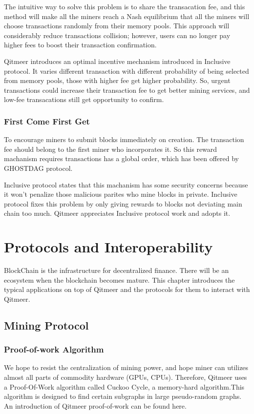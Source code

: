 \documentclass[a4paper,11pt]{article}
\begin{document}
The intuitive way to solve this problem is to share the transacation fee, and this method will make all the miners reach a Nash equilibrium that all the miners will choose transactions randomly from their memory pools. This approach will considerably reduce transactions collision; however, users can no longer pay higher fees to boost their transaction confirmation. 

Qitmeer introduces an optimal incentive mechanism introduced in Inclusive protocol. It varies different transaction with different probability of being selected from memory pools, those with higher fee get higher probability. So, urgent transactions could increase their transaction fee to get better mining services, and low-fee transacations still get opportunity to confirm.

\subsubsection{First Come First Get}
To encourage miners to submit blocks immediately on creation. The transaction fee should belong to the first miner who incorporates it. So this reward machanism requires transactions has a global order, which has been offered by GHOSTDAG protocol. 

Inclusive protocol states that this machanism has some security concerns because it won't penalize those malicious parites who mine blocks in private. Inclusive protocol fixes this problem by only giving rewards to blocks not deviating main chain too much. Qitmeer appreciates Inclusive protocol work and adopts it.

\section{Protocols and Interoperability}
BlockChain is the infrastructure for  decentralized finance. There will be an ecosystem when the blockchain becomes mature. This chapter introduces the typical applications on top of Qitmeer and the protocols for them to interact with Qitmeer. 

\subsection{Mining Protocol}
\subsubsection{Proof-of-work Algorithm}

We hope to resist the centralization of mining power, and hope miner can utilizes almost all parts of commodity hardware (GPUs, CPUs).
Therefore, Qitmeer uses a Proof-Of-Work algorithm called Cuckoo Cycle\cite{cuckoocycle}, 
a memory-hard algorithm.This algorithm is designed to find certain subgraphs in large pseudo-random graphs. 
An introduction of Qitmeer proof-of-work can be found here.\cite{qitmeerpow} 
\end{document}
